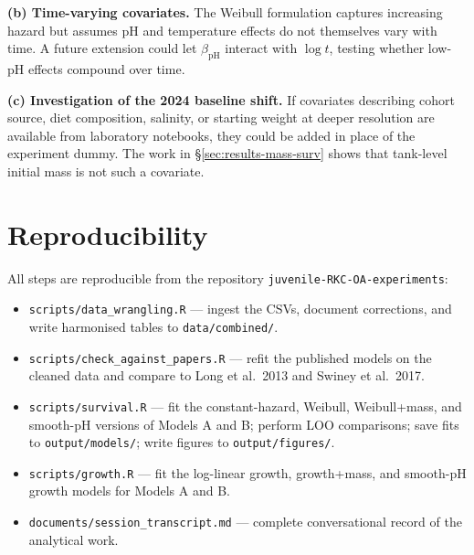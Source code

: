 \documentclass[11pt]{article}
\begin{document}
\noindent\textbf{(b) Time-varying covariates.} The Weibull formulation captures increasing hazard but assumes pH and temperature effects do not themselves vary with time. A future extension could let $\beta_{\text{pH}}$ interact with $\log t$, testing whether low-pH effects compound over time.

\noindent\textbf{(c) Investigation of the 2024 baseline shift.} If covariates describing cohort source, diet composition, salinity, or starting weight at deeper resolution are available from laboratory notebooks, they could be added in place of the experiment dummy. The work in §\ref{sec:results-mass-surv} shows that tank-level initial mass is not such a covariate.

\section{Reproducibility}

All steps are reproducible from the repository \texttt{juvenile-RKC-OA-experiments}:
\begin{itemize}
\item \texttt{scripts/data\_wrangling.R} --- ingest the CSVs, document corrections, and write harmonised tables to \texttt{data/combined/}.
\item \texttt{scripts/check\_against\_papers.R} --- refit the published models on the cleaned data and compare to Long et al.\ 2013 and Swiney et al.\ 2017.
\item \texttt{scripts/survival.R} --- fit the constant-hazard, Weibull, Weibull+mass, and smooth-pH versions of Models A and B; perform LOO comparisons; save fits to \texttt{output/models/}; write figures to \texttt{output/figures/}.
\item \texttt{scripts/growth.R} --- fit the log-linear growth, growth+mass, and smooth-pH growth models for Models A and B.
\item \texttt{documents/session\_transcript.md} --- complete conversational record of the analytical work.
\end{itemize}
\end{document}
